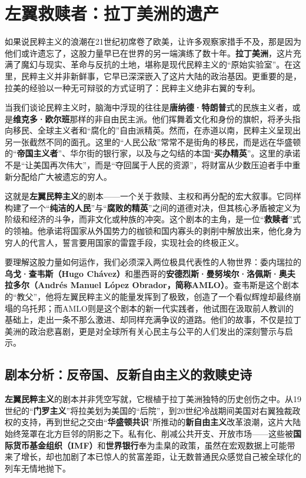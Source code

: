 \chapter{左翼救赎者：拉丁美洲的遗产}

如果说民粹主义的浪潮在21世纪初席卷了欧美，让许多观察家措手不及，那是因为他们或许遗忘了，这股力量早已在世界的另一端演练了数十年。\textbf{拉丁美洲}，这片充满了魔幻与现实、革命与反抗的土地，堪称是现代民粹主义的“原始实验室”。在这里，民粹主义并非新鲜事，它早已深深嵌入了这片大陆的政治基因。更重要的是，拉美的经验以一种无可辩驳的方式证明了：民粹主义绝非右翼的专利。

当我们谈论民粹主义时，脑海中浮现的往往是\textbf{唐纳德·特朗普}式的民族主义者，或是\textbf{维克多·欧尔班}那样的非自由民主派。他们挥舞着文化和身份的旗帜，将矛头指向移民、全球主义者和“腐化的”自由派精英。然而，在赤道以南，民粹主义呈现出另一张截然不同的面孔。这里的“人民公敌”常常不是街角的移民，而是远在华盛顿的“\textbf{帝国主义者}”、华尔街的银行家，以及与之勾结的本国“\textbf{买办精英}”。这里的承诺不是“让美国再次伟大”，而是“夺回属于人民的资源”，将财富从少数压迫者手中重新分配给广大被遗忘的穷人。

这就是\textbf{左翼民粹主义}的剧本——一个关于救赎、主权和再分配的宏大叙事。它同样构建了一个“\textbf{纯洁的人民}”与“\textbf{腐败的精英}”之间的道德对决，但其核心矛盾被定义为阶级和经济的斗争，而非文化或种族的冲突。这个剧本的主角，是一位“\textbf{救赎者}”式的领袖。他承诺将国家从外国势力的枷锁和国内寡头的剥削中解放出来，他化身为穷人的代言人，誓言要用国家的雷霆手段，实现社会的终极正义。

要理解这股力量如何运作，我们必须深入两位极具代表性的人物世界：委内瑞拉的\textbf{乌戈·查韦斯（Hugo Chávez）}和墨西哥的\textbf{安德烈斯·曼努埃尔·洛佩斯·奥夫拉多尔（Andrés Manuel López Obrador，简称AMLO）}。查韦斯是这个剧本的“教父”，他将左翼民粹主义的能量发挥到了极致，创造了一个看似辉煌却最终崩塌的乌托邦；而AMLO则是这个剧本的新一代实践者，他试图在汲取前人教训的基础上，走出一条不那么激进、却同样充满争议的道路。他们的故事，不仅是拉丁美洲的政治悲喜剧，更是对全球所有关心民主与公平的人们发出的深刻警示与启示。

\section{剧本分析：反帝国、反新自由主义的救赎史诗}
\textbf{左翼民粹主义}的剧本并非凭空写就，它根植于拉丁美洲独特的历史创伤之中。从19世纪的“\textbf{门罗主义}”将拉美划为美国的“后院”，到20世纪冷战期间美国对右翼独裁政权的支持，再到世纪之交由“\textbf{华盛顿共识}”所推动的\textbf{新自由主义}改革浪潮，这片大陆始终笼罩在北方巨邻的阴影之下。私有化、削减公共开支、开放市场——这些被\textbf{国际货币基金组织（IMF）}和\textbf{世界银行}奉为圭臬的政策，虽然在宏观数据上可能带来了增长，却也加剧了本已惊人的贫富差距，让无数普通民众感觉自己被全球化的列车无情地抛下。

